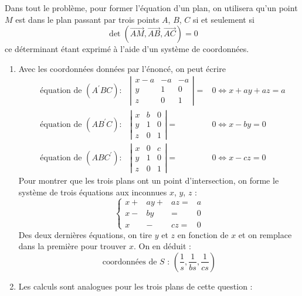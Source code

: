 Dans tout le problème, pour former l'équation d'un plan, on utilisera qu'un point $M$ est dans le plan passant par trois points $A$, $B$, $C$ si et seulement si
\begin{displaymath}
 \det(\overrightarrow{AM},\overrightarrow{AB},\overrightarrow{AC})=0
\end{displaymath}
ce déterminant étant exprimé à l'aide d'un système de coordonnées.
\begin{enumerate}
 \item Avec les coordonnées données par l'énoncé, on peut écrire
\begin{align*}
&\text{équation de } (A^\prime BC) :& \left\vert \begin{matrix}
  x-a & -a & -a \\
  y & 1 & 0 \\
  z & 0 & 1 
\end{matrix}\right\vert =& 0 \Leftrightarrow x+ay+az=a \\
&\text{équation de } (AB^\prime C) :& \left\vert \begin{matrix}
  x & b & 0 \\
  y & 1 & 0 \\
  z & 0 & 1 
\end{matrix}\right\vert =& 0 \Leftrightarrow x-by=0 \\
&\text{équation de } (ABC^\prime ) :& \left\vert \begin{matrix}
  x & 0 & c \\
  y & 1 & 0 \\
  z & 0 & 1 
\end{matrix}\right\vert =& 0 \Leftrightarrow x-cz=0 
\end{align*}
Pour montrer que les trois plans ont un point d'intersection, on forme le système de trois équations aux inconnues $x$, $y$, $z$ :
\begin{displaymath}
 \left\lbrace 
\begin{aligned}
 x +& ay +& az =& a \\
x-&by & =& 0 \\
x & -& cz =&0
\end{aligned}
\right. 
\end{displaymath}
Des deux dernières équations, on tire $y$ et $z$ en fonction de $x$ et on remplace dans la première pour trouver $x$. On en déduit :
\begin{displaymath}
 \text{coordonnées de $S$ : } \left( \dfrac{1}{s} , \dfrac{1}{bs} , \dfrac{1}{cs}\right) 
\end{displaymath}
\item Les calculs sont analogues pour les trois plans de cette question :

\end{enumerate}
